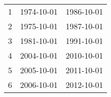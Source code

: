 % 
\begin{tabular}{ccc}
  \hline
  \hline
1 & 1974-10-01 & 1986-10-01 \\ 
  2 & 1975-10-01 & 1987-10-01 \\ 
  3 & 1981-10-01 & 1991-10-01 \\ 
  4 & 2004-10-01 & 2010-10-01 \\ 
  5 & 2005-10-01 & 2011-10-01 \\ 
  6 & 2006-10-01 & 2012-10-01 \\ 
   \hline
\end{tabular}
